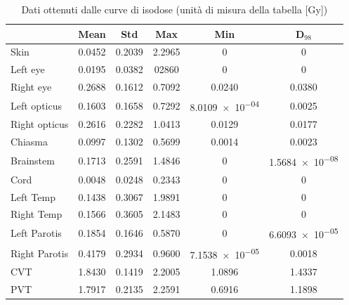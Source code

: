 \documentclass[a4paper,12pt]{article}
\begin{document}
                \begin{table}[H]
                        \centering
                        \label{tab:dati_malposizionamento_protoni}
                        \begin{tabular}{
                            l | c | c | c | c | c |
                        }
                            \toprule
                            & Mean & Std & Max & Min & D$_{98}$\\
                            \midrule
                            Skin & 0.0452 & 0.2039 & 2.2965 & 0 & 0 \\
                            Left eye & 0.0195 & 0.0382 & 02860 & 0 & 0 \\
                            Right eye & 0.2688 & 0.1612 & 0.7092 & 0.0240 & 0.0380 \\
                            Left opticus & 0.1603 & 0.1658 & 0.7292 & \num{8.0109e-04} & 0.0025 \\
                            Right opticus & 0.2616 & 0.2282 & 1.0413 & 0.0129 & 0.0177 \\
                            Chiasma & 0.0997 & 0.1302 & 0.5699 & 0.0014 & 0.0023 \\
                            Brainstem & 0.1713 & 0.2591 & 1.4846 & 0 & \num{1.5684e-08} \\
                            Cord & 0.0048 & 0.0248 & 0.2343 & 0 & 0 \\
                            Left Temp & 0.1438 & 0.3067 & 1.9891 & 0 & 0 \\
                            Right Temp & 0.1566 & 0.3605 & 2.1483 & 0 & 0 \\
                            Left Parotis & 0.1854 & 0.1646 & 0.5870 & 0 & \num{6.6093e-05} \\
                            Right Parotis & 0.4179 & 0.2934 & 0.9600 & \num{7.1538e-05} & 0.0018 \\
                            CVT & 1.8430 & 0.1419 & 2.2005 & 1.0896 & 1.4337 \\
                            PVT & 1.7917 & 0.2135 & 2.2591 & 0.6916 & 1.1898 \\
                            \bottomrule
                        \end{tabular}
                        \caption{Dati ottenuti dalle curve di isodose (unità di misura della tabella [\unit{\gray}])}
                    \end{table}
\end{document}
